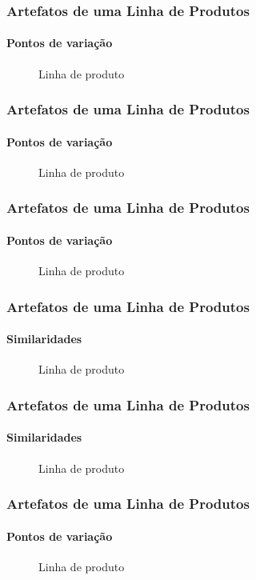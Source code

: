 \begin{frame}
\frametitle{Artefatos de uma Linha de Produtos}
\framesubtitle{Pontos de variação}

  \begin{figure}
  \caption{Linha de produto}
  \end{figure}

\end{frame}

\begin{frame}
\frametitle{Artefatos de uma Linha de Produtos}
\framesubtitle{Pontos de variação}

  \begin{figure}
  \caption{Linha de produto}
  \end{figure}

\end{frame}

\begin{frame}
\frametitle{Artefatos de uma Linha de Produtos}
\framesubtitle{Pontos de variação}

  \begin{figure}
  \caption{Linha de produto}
  \end{figure}

\end{frame}

\begin{frame}
\frametitle{Artefatos de uma Linha de Produtos}
\framesubtitle{Similaridades}

  \begin{figure}
  \caption{Linha de produto}
  \end{figure}

\end{frame}

\begin{frame}
\frametitle{Artefatos de uma Linha de Produtos}
\framesubtitle{Similaridades}

  \begin{figure}
  \caption{Linha de produto}
  \end{figure}

\end{frame}

\begin{frame}
\frametitle{Artefatos de uma Linha de Produtos}
\framesubtitle{Pontos de variação}

  \begin{figure}
  \caption{Linha de produto}
  \end{figure}

\end{frame}
